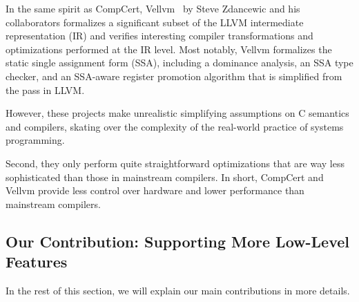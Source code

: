 In the same spirit as CompCert, Vellvm~\cite{vellvm} by Steve Zdancewic and his collaborators
formalizes a significant subset of the LLVM intermediate representation (IR) and verifies
interesting compiler transformations and optimizations performed at the IR level.  Most notably,
Vellvm formalizes the static single assignment form (SSA), including a dominance analysis, an SSA
type checker, and an SSA-aware register promotion algorithm that is simplified from the
 pass in LLVM.


However, these projects make unrealistic simplifying assumptions on C semantics and compilers,
skating over the complexity of the real-world practice of systems programming.


Second, they only perform quite straightforward optimizations that are way less sophisticated than
those in mainstream compilers.  In short, CompCert and Vellvm provide less control over hardware and
lower performance than mainstream compilers.



\subsection{Our Contribution: Supporting More Low-Level Features}


In the rest of this section, we will explain our main contributions in more details.



